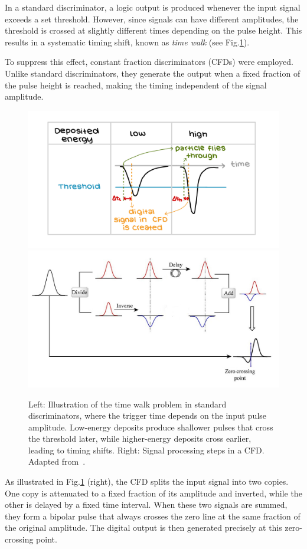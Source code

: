 \documentclass[11pt,a4paper]{article}
\begin{document}
In a standard discriminator, a logic output is produced whenever the input signal exceeds a set threshold. However, since signals can have different amplitudes, the threshold is crossed at slightly different times depending on the pulse height. This results in a systematic timing shift, known as \emph{time walk} (see Fig.\ref{CFD}). 

To suppress this effect, constant fraction discriminators (CFDs) were employed. Unlike standard discriminators, they generate the output when a fixed fraction of the pulse height is reached, making the timing independent of the signal amplitude. 



\begin{figure}[h]
    \centering
    \includegraphics[width=0.48\linewidth]{CFD.jpeg}
    \includegraphics[width=0.48\linewidth]{CFD_Diagram.jpeg}
    \caption{Left: Illustration of the time walk problem in standard discriminators, where the trigger time depends on the input pulse amplitude. Low-energy deposits produce shallower pulses that cross the threshold later, while higher-energy deposits cross earlier, leading to timing shifts. Right: Signal processing steps in a CFD. Adapted from~\cite{CFD}.}
    \label{CFD}
\end{figure}


As illustrated in Fig.\ref{CFD} (right), the CFD splits the input signal into two copies. One copy is attenuated to a fixed fraction of its amplitude and inverted, while the other is delayed by a fixed time interval. When these two signals are summed, they form a bipolar pulse that always crosses the zero line at the same fraction of the original amplitude. The digital output is then generated precisely at this zero-crossing point.  
\end{document}
